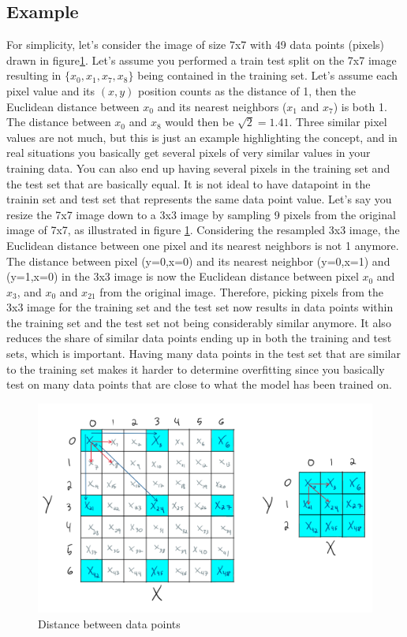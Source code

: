\documentclass[11pt, a4paper]{article}
\begin{document}
\subsection*{Example}
For simplicity, let’s consider the image of size 7x7 
with 49 data points (pixels) drawn in figure\ref{fig:image_resizing}. Let's assume you performed a train test split on the 7x7 image resulting in $\{x_0,x_1,x_7,x_8\}$ being contained in the 
training set. Let's assume each pixel value and its $(x,y)$ position counts as the distance of 1, then the Euclidean distance between $x_0$ and its nearest neighbors ($x_1$ and $x_7$) is both 1. 
The distance between $x_0$ and $x_8$ would then be $\sqrt{2}=1.41$.
Three similar pixel values are not much, but this is just an example highlighting the concept, and in real situations you basically get several pixels of very similar values in your training data. 
You can also end up having several pixels in the training set and the test set that are basically equal. It is not ideal to have datapoint in the trainin set and test set that represents the same data point value. 
Let’s say you resize the 7x7 image down to a 3x3 image by sampling 9 pixels from the original image of 7x7, as illustrated in figure \ref{fig:image_resizing}. Considering the resampled 3x3 image,
the Euclidean distance between one pixel and its nearest neighbors is not 1 anymore. The distance between pixel (y=0,x=0) and its nearest neighbor (y=0,x=1) and (y=1,x=0) 
in the 3x3 image is now the Euclidean distance between pixel $x_0$ and $x_3$, and $x_0$ and $x_{21}$ from the original image. Therefore, picking pixels from the 3x3 image for the training
set and the test set now results in data points within the training set and the test set not being considerably similar anymore. It also reduces the share of similar data 
points ending up in both the training and test sets, which is important. Having many data points in the test set that are similar to the training set makes it harder to 
determine overfitting since you basically test on many data points that are close to what the model has been trained on.
\begin{figure}
  \centering
  \includegraphics[scale=0.28]{figures/EX6_resizing.png}
  \caption{Distance between data points}
  \label{fig:image_resizing}
\end{figure}
\end{document}
